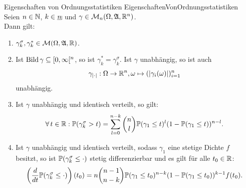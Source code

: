 \begin{lemma}{Eigenschaften von Ordnungsstatistiken}
             {EigenschaftenVonOrdnungsstatistiken}
Seien $n \in \mathbb{N}$, $k \in \haken n$ und $\gamma \in \mathcal{M}_n(\Omega,\mathfrak{A},\mathbb{R}^n)$.\\
Dann gilt:
\begin{enumerate}[(1)]
	\item\label{EigenschaftenVonOrdnungsstatistiken1}
	$\gamma^\sigma_k, \gamma^\ast_k \in \mathcal{M}(\Omega, \mathfrak{A}, \mathbb{R})$.
	\item\label{EigenschaftenVonOrdnungsstatistiken2}
	Ist $\mathop{\textrm{Bild}}\nolimits \gamma \subseteq [0, \infty[^n$, so ist
	$\gamma_k^\ast = \gamma^\sigma_k$. Ist $\gamma$ unabhängig, so ist auch
	\[\gamma_{\left|\cdot\right|}: \Omega \rightarrow \mathbb{R}^n, \omega \mapsto
	(\left|\gamma_i(\omega)\right|)_{i=1}^n\]
	unabhängig.
	\item\label{EigenschaftenVonOrdnungsstatistiken3}
	Ist $\gamma$ unabhängig und identisch verteilt,
	so gilt:
	\[\forall\, t \in \mathbb{R}: \mathbb{P}(\gamma^\sigma_k > t) 
	=\sum_{l=0}^{n-k}\binom n l
	\mathbb{P}(\gamma_1\le t)^l(1-\mathbb{P}(\gamma_1\le t))^{n-l}\text.\]
	\item\label{EigenschaftenVonOrdnungsstatistiken4}
	Ist $\gamma$ unabhängig und identisch verteilt, sodass $\gamma_1$ eine
	stetige Dichte $f$ besitzt, so ist 
	$\mathbb{P}(\gamma^\sigma_k \le \cdot)$ stetig differenzierbar und es gilt
	für alle $t_0 \in \mathbb{R}$:
	\[\left(\frac d {dt} \mathbb{P}(\gamma^\sigma_k\le \cdot) \right)(t_0) 
	= n\binom{n-1}{n-k}
	\mathbb{P}(\gamma_1 \le t_0)^{n-k}(1-\mathbb{P}(\gamma_1 \le t_0))^{k-1}f(t_0)\text.\]
\end{enumerate}
\end{lemma}
